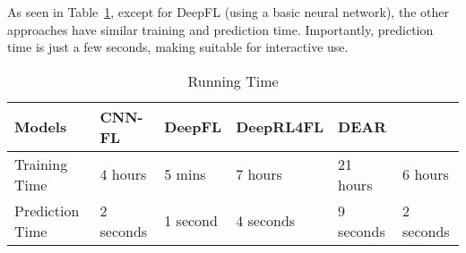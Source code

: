 \vspace{3pt}
 As seen in Table~\ref{tab:time}, except
for DeepFL (using a basic neural network), 
the other approaches have similar training and prediction
time. Importantly, prediction time is just a few seconds, making
{\tool} suitable for interactive use.



\begin{table}[t]
	\caption{Running Time}
	\vspace{-12pt}
	\begin{center}
        \tabcolsep 2pt
		\footnotesize
		\renewcommand{\arraystretch}{1} 
		\begin{tabular}{p{1.6cm}<{\centering}|p{1cm}<{\centering}|p{1cm}<{\centering}|p{1.2cm}<{\centering}|p{1cm}<{\centering}|p{1.1cm}<{\centering}}
			\hline
			Models          & CNN-FL & DeepFL & DeepRL4FL & DEAR & {\tool} \\\hline
			Training Time & 4 hours & 5 mins & 7 hours & 21 hours & 6 hours \\
			Prediction Time & 2 seconds & 1 second & 4 seconds &9 seconds & 2 seconds\\ 
			\hline
		\end{tabular}
		\label{tab:time}
	\end{center}
\vspace{-5pt}
\end{table}

